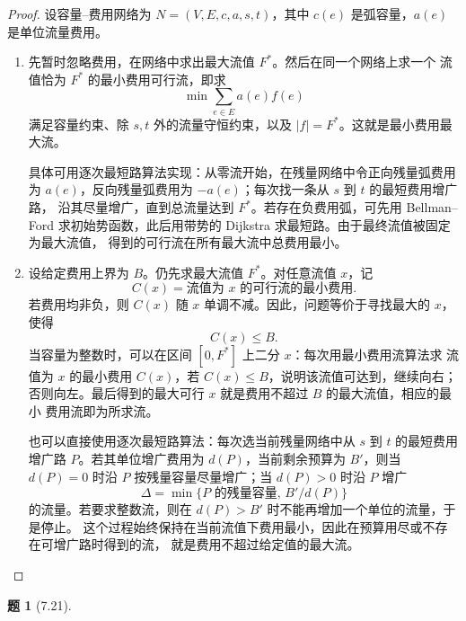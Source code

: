 \documentclass[11pt, a4paper]{article}
\newtheorem{problem}{题}
\begin{document}
\begin{proof}
    设容量--费用网络为 $N=(V,E,c,a,s,t)$，其中 $c(e)$ 是弧容量，$a(e)$ 是单位流量费用。

    \begin{enumerate}[label=(\arabic*)]
        \item 先暂时忽略费用，在网络中求出最大流值 $F^*$。然后在同一个网络上求一个
        流值恰为 $F^*$ 的最小费用可行流，即求
        \[
            \min \sum_{e\in E} a(e)f(e)
        \]
        满足容量约束、除 $s,t$ 外的流量守恒约束，以及 $|f|=F^*$。这就是最小费用最大流。

        具体可用逐次最短路算法实现：从零流开始，在残量网络中令正向残量弧费用为
        $a(e)$，反向残量弧费用为 $-a(e)$；每次找一条从 $s$ 到 $t$ 的最短费用增广路，
        沿其尽量增广，直到总流量达到 $F^*$。若存在负费用弧，可先用 Bellman--Ford
        求初始势函数，此后用带势的 Dijkstra 求最短路。由于最终流值被固定为最大流值，
        得到的可行流在所有最大流中总费用最小。

        \item 设给定费用上界为 $B$。仍先求最大流值 $F^*$。对任意流值 $x$，记
        \[
            C(x)=\text{流值为 }x\text{ 的可行流的最小费用}.
        \]
        若费用均非负，则 $C(x)$ 随 $x$ 单调不减。因此，问题等价于寻找最大的 $x$，
        使得
        \[
            C(x)\le B.
        \]
        当容量为整数时，可以在区间 $[0,F^*]$ 上二分 $x$：每次用最小费用流算法求
        流值为 $x$ 的最小费用 $C(x)$，若 $C(x)\le B$，说明该流值可达到，继续向右；
        否则向左。最后得到的最大可行 $x$ 就是费用不超过 $B$ 的最大流值，相应的最小
        费用流即为所求流。

        也可以直接使用逐次最短路算法：每次选当前残量网络中从 $s$ 到 $t$ 的最短费用
        增广路 $P$。若其单位增广费用为 $d(P)$，当前剩余预算为 $B'$，则当 $d(P)=0$
        时沿 $P$ 按残量容量尽量增广；当 $d(P)>0$ 时沿 $P$ 增广
        \[
            \Delta=\min\{\text{$P$ 的残量容量},\, B'/d(P)\}
        \]
        的流量。若要求整数流，则在 $d(P)>B'$ 时不能再增加一个单位的流量，于是停止。
        这个过程始终保持在当前流值下费用最小，因此在预算用尽或不存在可增广路时得到的流，
        就是费用不超过给定值的最大流。
    \end{enumerate}
\end{proof}

\vspace{1em}

\begin{problem}[7.21]
\end{problem}
\end{document}
